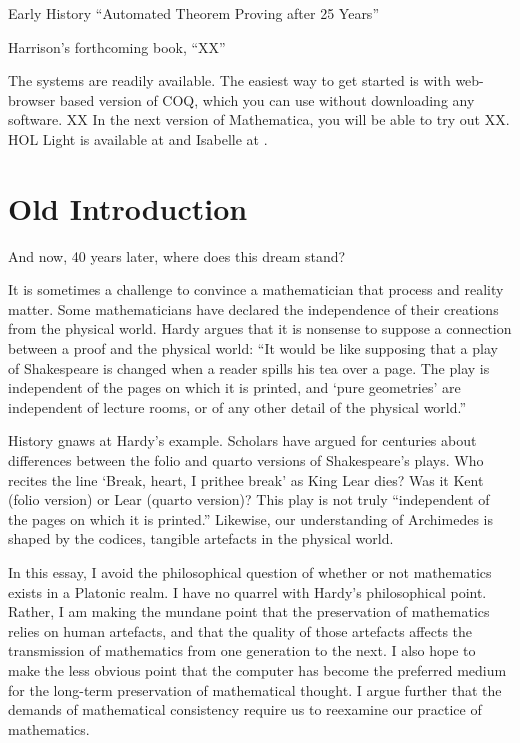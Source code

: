 \documentclass{llncs}
\begin{document}
Early History ``Automated Theorem Proving after 25 Years''

Harrison's forthcoming book, ``XX''

The systems are readily available.
The easiest way to get started
is with web-browser based version of COQ, which you can use without downloading any software.  XX In the next version of Mathematica, you will be able to
try out XX.  HOL Light is available at \cite{XX} and Isabelle at \cite{XX}.




\section{Old Introduction}

And now, 40 years later, where does this dream stand?

It is sometimes a challenge to convince a mathematician that process and
reality matter. Some mathematicians have declared the independence
of their creations from
the physical world.  Hardy argues that it is nonsense to suppose
a connection between a proof and the physical world:
``It would be like supposing that a play of Shakespeare is changed when
a reader spills his tea over a page.  The play is independent of the pages
on which it is printed, and `pure geometries' are independent of lecture
rooms, or of any other detail of the physical world.''

History gnaws at Hardy's example.
Scholars have argued for centuries about differences between the folio
and quarto versions of Shakespeare's plays.  Who recites the line
`Break, heart, I prithee break' as King Lear dies?  Was it Kent (folio version)
or Lear (quarto version)?  This play is not truly ``independent of the pages
on which it is printed.'' Likewise, 
our understanding of  Archimedes  is
shaped by the codices, tangible artefacts in the physical world.  

In this essay,
I avoid the
philosophical question of whether or not mathematics exists in a Platonic realm.
I have no quarrel with Hardy's philosophical point.
Rather, I am making the mundane point that the preservation
of mathematics relies on human artefacts, and that the quality of those
artefacts affects the transmission of mathematics
from one generation to the next.  I also hope to make the less obvious
point that the computer has become the preferred medium for the long-term
preservation of mathematical thought.  I argue further that the demands of
mathematical consistency require us to reexamine our practice of mathematics.
\end{document}
